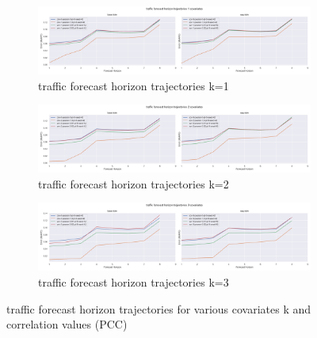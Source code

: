 \documentclass[letterpaper]{article}
\begin{document}
\begin{figure}[tbp]
\begin{subfigure}{\textwidth}
\centering
\includegraphics[width=\linewidth]{figures/base-lstm_seg-lstm_traffic_k_1_trajectory.png}
\caption{traffic forecast horizon trajectories k=1}
\label{fig:base-lstm_seg-lstm_traffic_k_1_trajectory}
\end{subfigure}

\begin{subfigure}{\textwidth}
\centering
\includegraphics[width=\linewidth]{figures/base-lstm_seg-lstm_traffic_k_2_trajectory.png}
\caption{traffic forecast horizon trajectories k=2}
\label{fig:base-lstm_seg-lstm_traffic_k_2_trajectory}
\end{subfigure}

\begin{subfigure}{\textwidth}
\centering
\includegraphics[width=\linewidth]{figures/base-lstm_seg-lstm_traffic_k_3_trajectory.png}
\caption{traffic forecast horizon trajectories k=3}
\label{fig:base-lstm_seg-lstm_traffic_k_3_trajectory}
\end{subfigure}
\caption{traffic forecast horizon trajectories for various covariates k and correlation values (PCC)}
\label{fig:base-lstm_seg-lstm_traffic_trajectory}
\end{figure}
\end{document}
